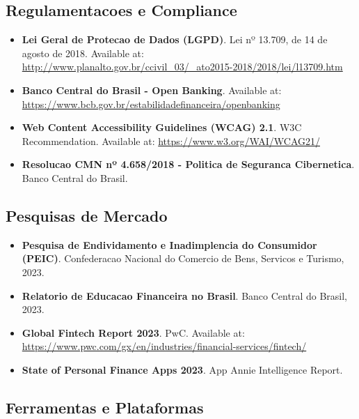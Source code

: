 \subsection{Regulamentacoes e Compliance}

\begin{itemize}
    \item \textbf{Lei Geral de Protecao de Dados (LGPD)}. Lei nº 13.709, de 14 de agosto de 2018. Available at: \url{http://www.planalto.gov.br/ccivil_03/_ato2015-2018/2018/lei/l13709.htm}
    
    \item \textbf{Banco Central do Brasil - Open Banking}. Available at: \url{https://www.bcb.gov.br/estabilidadefinanceira/openbanking}
    
    \item \textbf{Web Content Accessibility Guidelines (WCAG) 2.1}. W3C Recommendation. Available at: \url{https://www.w3.org/WAI/WCAG21/}
    
    \item \textbf{Resolucao CMN nº 4.658/2018 - Politica de Seguranca Cibernetica}. Banco Central do Brasil.
\end{itemize}

\subsection{Pesquisas de Mercado}

\begin{itemize}
    \item \textbf{Pesquisa de Endividamento e Inadimplencia do Consumidor (PEIC)}. Confederacao Nacional do Comercio de Bens, Servicos e Turismo, 2023.
    
    \item \textbf{Relatorio de Educacao Financeira no Brasil}. Banco Central do Brasil, 2023.
    
    \item \textbf{Global Fintech Report 2023}. PwC. Available at: \url{https://www.pwc.com/gx/en/industries/financial-services/fintech/}
    
    \item \textbf{State of Personal Finance Apps 2023}. App Annie Intelligence Report.
\end{itemize}

\subsection{Ferramentas e Plataformas}

